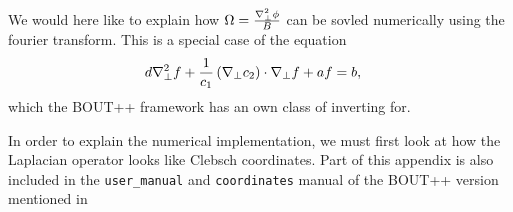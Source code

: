 We would here like to explain how $\Omega = \frac{\nabla_\perp^2\phi}{B}$ can be sovled numerically using the fourier transform.
This is a special case of the equation
%
\begin{align}
    d&\nabla_\perp^2f + \frac{1}{c_1}\left(\nabla_\perp c_2\right)\cdot\nabla_\perp f + af = b,
\label{eq:to_invert_tri}
\end{align}
%
which the BOUT++ framework has an own class of inverting for.

In order to explain the numerical implementation, we must first look at how the Laplacian operator looks like Clebsch coordinates.
Part of this appendix is also included in the \texttt{user\_manual} and \texttt{coordinates} manual of the BOUT++ version mentioned in

